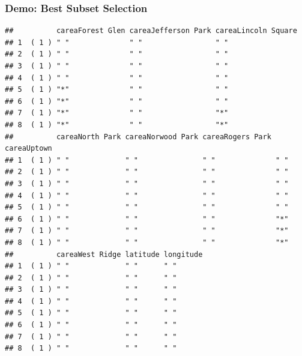 \documentclass[
  shownotes,
  xcolor={svgnames},
  hyperref={colorlinks,citecolor=DarkBlue,linkcolor=DarkRed,urlcolor=DarkBlue}
  ]{beamer}
\begin{document}
\begin{frame}[fragile]
\frametitle{Demo: Best Subset Selection}
\begin{tiny}
\begin{verbatim}       
##          careaForest Glen careaJefferson Park careaLincoln Square
## 1  ( 1 ) " "              " "                 " "                
## 2  ( 1 ) " "              " "                 " "                
## 3  ( 1 ) " "              " "                 " "                
## 4  ( 1 ) " "              " "                 " "                
## 5  ( 1 ) "*"              " "                 " "                
## 6  ( 1 ) "*"              " "                 " "                
## 7  ( 1 ) "*"              " "                 "*"                
## 8  ( 1 ) "*"              " "                 "*"                
##          careaNorth Park careaNorwood Park careaRogers Park careaUptown
## 1  ( 1 ) " "             " "               " "              " "        
## 2  ( 1 ) " "             " "               " "              " "        
## 3  ( 1 ) " "             " "               " "              " "        
## 4  ( 1 ) " "             " "               " "              " "        
## 5  ( 1 ) " "             " "               " "              " "        
## 6  ( 1 ) " "             " "               " "              "*"        
## 7  ( 1 ) " "             " "               " "              "*"        
## 8  ( 1 ) " "             " "               " "              "*"        
##          careaWest Ridge latitude longitude
## 1  ( 1 ) " "             " "      " "      
## 2  ( 1 ) " "             " "      " "      
## 3  ( 1 ) " "             " "      " "      
## 4  ( 1 ) " "             " "      " "      
## 5  ( 1 ) " "             " "      " "      
## 6  ( 1 ) " "             " "      " "      
## 7  ( 1 ) " "             " "      " "      
## 8  ( 1 ) " "             " "      " "
\end{verbatim}
\end{tiny}
\end{frame}
\end{document}
